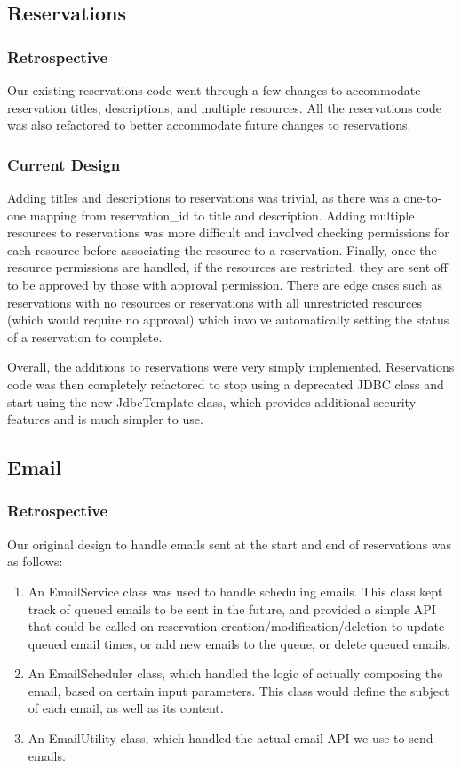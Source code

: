 \documentclass[12pt]{article}
\begin{document}
\subsection{Reservations}
\subsubsection{Retrospective}
Our existing reservations code went through a few changes to accommodate reservation titles, descriptions, and multiple resources. All the reservations code was also refactored to better accommodate future changes to reservations. 

\subsubsection{Current Design}
Adding titles and descriptions to reservations was trivial, as there was a one-to-one mapping from reservation\_id to title and description. Adding multiple resources to reservations was more difficult and involved checking permissions for each resource before associating the resource to a reservation. Finally, once the resource permissions are handled, if the resources are restricted, they are sent off to be approved by those with approval permission. There are edge cases such as reservations with no resources or reservations with all unrestricted resources (which would require no approval) which involve automatically setting the status of a reservation to complete. 

Overall, the additions to reservations were very simply implemented. Reservations code was then completely refactored to stop using a deprecated JDBC class and start using the new JdbcTemplate class, which provides additional security features and is much simpler to use. 

\subsection{Email}
\label{sec:EMAIL}
\subsubsection{Retrospective}
Our original design to handle emails sent at the start and end of reservations was as follows:
\begin{enumerate}
    \item An EmailService class was used to handle scheduling emails. This class kept track of queued emails to be sent in the future, and provided a simple API that could be called on reservation creation/modification/deletion to update queued email times, or add new emails to the queue, or delete queued emails.
    \item An EmailScheduler class, which handled the logic of actually composing the email, based on certain input parameters. This class would define the subject of each email, as well as its content. 
    \item An EmailUtility class, which handled the actual email API we use to send emails. 
\end{enumerate}
\end{document}
